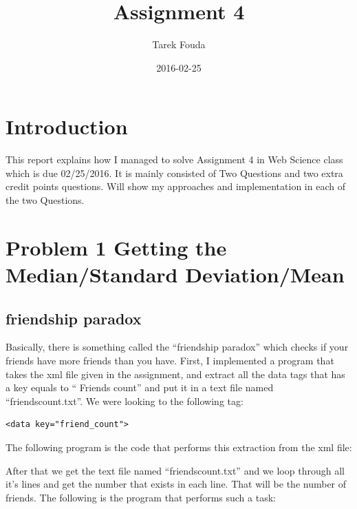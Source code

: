 \documentclass{article}
\title{Assignment 4}
\date{2016-02-25}
\author{Tarek Fouda}
\begin{document}
  \maketitle
\section{Introduction}
This report explains how I managed to solve Assignment 4  in Web Science class which is due 02/25/2016. It is mainly consisted of Two Questions and two extra credit points questions. Will show my approaches and implementation in each of the two Questions.

\section{Problem 1 Getting the Median/Standard Deviation/Mean} \label{problem1}

\subsection{friendship paradox}

Basically, there is something called the ``friendship paradox''  which checks if your friends have more friends than you have.
First, I implemented a program that takes the xml file given in the assignment, and extract all the data tags that has a key equals to `` Friends count'' and put it in a text file named ``friendscount.txt''. 
We were looking to the following tag:
\begin{lstlisting}
<data key="friend_count">
\end{lstlisting} 

The following program is the code that performs this extraction from the xml file:


After that we get the text file named ``friendscount.txt'' and we loop through all it's lines and get the number that exists in each line. That will be the number of friends.
The following is the program that performs such a task:

\end{document}
